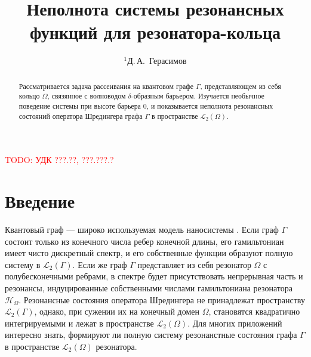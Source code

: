 \documentclass{nsart_eng}
\newcommand{\mcL}{\mathcal{L}}
\newcommand{\mcH}{\mathcal{H}}
\newcommand{\todo}[1]{{\large \textcolor{red}{TODO: #1}}}
\begin{document}
\title[Неполнота системы резонансных функций для резонатора-кольца]
{Неполнота системы резонансных функций для резонатора-кольца}

\author[Д.\,А.~Герасимов]
{$^1$Д.\,А.~Герасимов}

\address{
$^1$ Санкт-Петербургский Национальный Исследовательский Университет Информационных Технологий, \\
Механики и Оптики,\\
Кронверкский пр., 49, Санкт-Петербург, 197101, Россия}


\todo{УДК ???.??, ???.???.?}%

\begin{abstract}
Рассматривается задача рассеивания на квантовом графе $\Gamma$, представляющем из себя кольцо $\Omega$, связянное с волноводом $\delta$-образным барьером. Изучается необычное поведение системы при высоте барьера 0, и показывается неполнота резонансных состояний оператора Шредингера графа $\Gamma$ в пространстве $\mcL_2(\Omega)$.
\end{abstract}


\maketitle

\section{Введение}

Квантовый граф — широко используемая модель наносистемы \cite{1, 2, 3, 4}. Если граф $\Gamma$ состоит только из конечного числа ребер конечной длины, его гамильтониан имеет чисто дискретный спектр, и его собственные функции образуют полную систему в $\mcL_2(\Gamma)$. Если же граф $\Gamma$ представляет из себя резонатор $\Omega$ с полубесконечными ребрами, в спектре будет присутствовать непрерывная часть и резонансы, индуцированные собственными числами гамильтониана резонатора $\mcH_\Omega$. Резонансные состояния оператора Шредингера не принадлежат пространству $\mcL_2(\Gamma)$, однако, при сужении их на конечный домен $\Omega$, становятся квадратично интегрируемыми и лежат в пространстве $\mcL_2(\Omega)$. Для многих приложений интересно знать, формируют ли полную систему резонанстные состояния графа $\Gamma$ в пространстве $\mcL_2(\Omega)$ резонатора.
\end{document}
